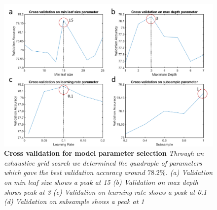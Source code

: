 \begin{figure}[h]
\center
\includegraphics[scale=0.4]{figure3/figure3.png}
\caption{\textbf{Cross validation for model parameter selection} \textit{Through an exhaustive grid search we determined the quadruple of parameters which gave the best validation accuracy around $78.2\%$. (a) Validation on min leaf size shows a peak at 15 (b) Validation on max depth shows peak at 3 (c) Validation on learning rate shows a peak at 0.1 (d) Validation on subsample shows a peak at 1}}
\end{figure}


\newpage
